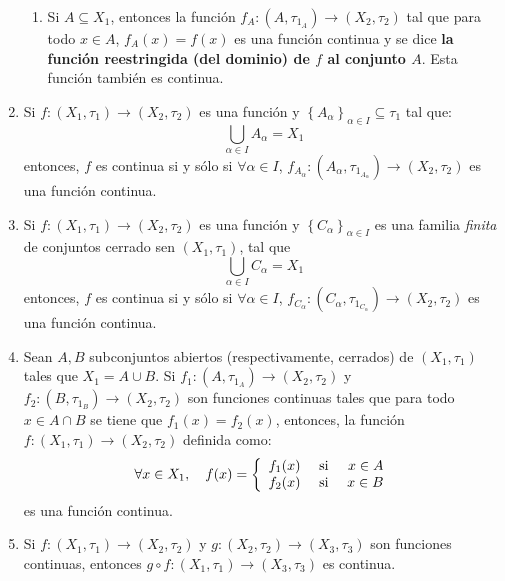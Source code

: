 \documentclass[12pt]{report}
\theoremstyle{largebreak}
\newcommand\cf[3]{\ensuremath{#1:#2\rightarrow#3}}
\begin{document}
\begin{exa}
\begin{enumerate}
\begin{enumerate}
                \item Si $A\subseteq X_1$, entonces la función $\cf{f_A}{(A,\tau_{1_A})}{(X_2,\tau_2)}$ tal que para todo $x\in A$, $f_A(x)=f(x)$ es una función continua y se dice \textbf{la función reestringida (del dominio) de $f$ al conjunto $A$}. Esta función también es continua.
            \end{enumerate}
            \item Si $\cf{f}{(X_1,\tau_1)}{(X_2,\tau_2)}$ es una función y $\left\{A_\alpha\right\}_{ \alpha\in I}\subseteq \tau_1$ tal que:
            \begin{equation*}
                \bigcup_{\alpha\in I}A_\alpha=X_1
            \end{equation*}
            entonces, $f$ es continua si y sólo si $\forall \alpha\in I$, $\cf{f_{A_\alpha}}{(A_\alpha,\tau_{1_{A_\alpha}})}{(X_2,\tau_2)}$ es una función continua.
            \item Si $\cf{f}{(X_1,\tau_1)}{(X_2,\tau_2)}$ es una función y $\left\{ C_\alpha\right\}_{\alpha\in I}$ es una familia \textit{finita} de conjuntos cerrado sen $(X_1,\tau_1)$, tal que
            \begin{equation*}
                \bigcup_{\alpha\in I}C_\alpha=X_1
            \end{equation*}
            entonces, $f$ es continua si y sólo si $\forall \alpha\in I$, $\cf{f_{C_\alpha}}{(C_\alpha,\tau_{1_{C_\alpha}})}{(X_2,\tau_2)}$ es una función continua.

            \item Sean $A,B$ subconjuntos abiertos (respectivamente, cerrados) de $(X_1,\tau_1)$ tales que $X_1=A\cup B$. Si $\cf{f_1}{(A,\tau_{1_A})}{(X_2,\tau_2)}$ y $\cf{f_2}{(B,\tau_{1_B})}{(X_2,\tau_2)}$ son funciones continuas tales que para todo $x\in A\cap B$ se tiene que $f_1(x)=f_2(x)$, entonces, la función $\cf{f}{(X_1,\tau_1)}{(X_2,\tau_2)}$ definida como:
            \begin{equation*}
                \forall x\in X_1,\quad f(x)=\left\{ \begin{array}{lcr}
                    f_1(x) &\textup{ si }& x\in A\\
                    f_2(x) &\textup{ si }& x\in B\\
                \end{array}\right.
            \end{equation*}
            es una función continua.

            \item Si $\cf{f}{(X_1,\tau_1)}{(X_2,\tau_2)}$ y $\cf{g}{(X_2,\tau_2)}{(X_3,\tau_3)}$ son funciones continuas, entonces $\cf{g\circ f}{(X_1,\tau_1)}{(X_3,\tau_3)}$ es continua.
        \end{enumerate}
    \end{exa}
\end{document}
